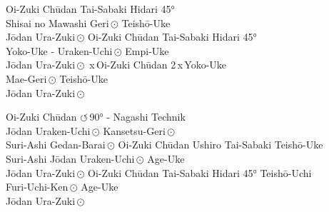 \begin{tcbitemize}[right=4pt,left=4pt,raster columns=3,raster equal height,colframe=GKD,colback=white,fonttitle=\bfseries]
	\tcbitem[squeezed title*={Kumite Ura 1}]
	Oi-Zuki Ch\={u}dan
	Tai-Sabaki Hidari 45°\\
	Shisai no Mawashi Geri\,\(\odot\)
	Teish\={o}-Uke\\
	J\={o}dan Ura-Zuki\,\(\odot\)
	\tcbitem[squeezed title*={Kumite Ura 2}]
	Oi-Zuki Ch\={u}dan
	Tai-Sabaki Hidari 45°\\
	Yoko-Uke - Uraken-Uchi\,\(\odot\)
	Empi-Uke\\
	J\={o}dan Ura-Zuki\,\(\odot\)
	\,x\,Oi-Zuki Ch\={u}dan
	2\,x\,Yoko-Uke\\
	Mae-Geri\,\(\odot\)
	Teish\={o}-Uke\\
	J\={o}dan Ura-Zuki\,\(\odot\)
\end{tcbitemize}
\null\vfill\null
\zwitepf
\null\vfill\null
\begin{tcbitemize}[right=4pt,left=4pt,raster columns=3,raster equal height,colframe=GKD,colback=white,fonttitle=\bfseries]
	\tcbitem[squeezed title*={Kumite Ura 4}]
	Oi-Zuki Ch\={u}dan
	\(\circlearrowleft\)\,90° - Nagashi Technik\\
	J\={o}dan Uraken-Uchi\,\(\odot\)
	Kansetsu-Geri\,\(\odot\)\\
	Suri-Ashi Gedan-Barai\,\(\odot\)
	\tcbitem[squeezed title*={Kumite Ura 5}]
	Oi-Zuki Ch\={u}dan
	Ushiro Tai-Sabaki Teish\={o}-Uke\\
	Suri-Ashi J\={o}dan Uraken-Uchi\,\(\odot\)
	Age-Uke\\
	J\={o}dan Ura-Zuki\,\(\odot\)
	\tcbitem[squeezed title*={Kumite Ura 6}]
	Oi-Zuki Ch\={u}dan
	Tai-Sabaki Hidari 45° Teish\={o}-Uchi\\
	Furi-Uchi-Ken\,\(\odot\)
	Age-Uke\\
	J\={o}dan Ura-Zuki\,\(\odot\)
\end{tcbitemize}
